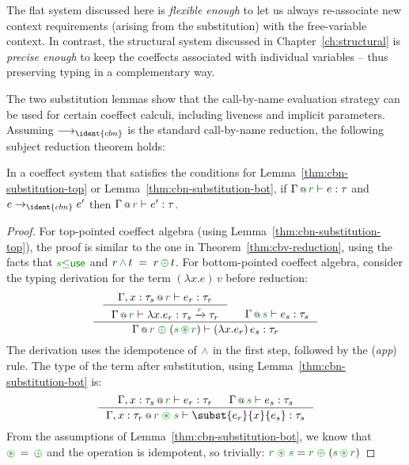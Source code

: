 \noindent
The flat system discussed here is \emph{flexible enough} to let us always re-associate new context 
requirements (arising from the substitution) with the free-variable context. In contrast, the 
structural system discussed in Chapter~\ref{ch:structural} is \emph{precise enough} to keep the 
coeffects associated with individual variables -- thus preserving typing in a complementary way.

The two substitution lemmas show that the call-by-name evaluation strategy can be used for
certain coeffect calculi, including liveness and implicit parameters. Assuming
$\reduce_{\ident{cbn}}$ is the standard call-by-name reduction, the following subject reduction
theorem holds:

\begin{theorem}
In a coeffect system that satisfies the conditions for Lemma~\ref{thm:cbn-substitution-top} or
Lemma~\ref{thm:cbn-substitution-bot}, if $\coctx{\Gamma}{\cclrd{r}} \vdash e : \tau$ 
and $e \rightarrow_{\ident{cbn}} e'$ then $\coctx{\Gamma}{\cclrd{r}} \vdash e' : \tau$.
\end{theorem}
\begin{proof}

For top-pointed coeffect algebra (using Lemma~\ref{thm:cbn-substitution-top}), the proof is similar
to the one in Theorem~\ref{thm:cbv-reduction}, using the facts that $\cclrd{s} \cleq \cunit$
and $r \,\czip\, t \;=\; r \,\cpar\, t$.
For bottom-pointed coeffect algebra, consider the typing derivation for the term
$(\lambda x.e)\,v$ before reduction:
%
\begin{equation*}
\inference
  { \inference
      {\coctx{\Gamma, x:\tau_s}{\cclrd{r}} \vdash e_r : \tau_r}
      {\coctx{\Gamma}{\cclrd{r}} \vdash \lambda x.e_r : \tau_s \xrightarrow{\cclrd{r}} \tau_r } &
   \coctx{\Gamma}{\cclrd{s}} \vdash e_s : \tau_s }
  {\coctx{\Gamma}{\cclrd{r} \;\cpar\; (\cclrd{s} \,\cseq\, \cclrd{r})} \vdash (\lambda x.e_r)\,e_s : \tau_r }
\end{equation*}
%
The derivation uses the idempotence of $\czip$ in the first step, followed by the 
(\emph{app}) rule. The type of the term after substitution, using Lemma~\ref{thm:cbn-substitution-bot} is:
%
\begin{equation*}
\inference
  { \coctx{\Gamma, x:\tau_s}{\cclrd{r}} \vdash e_r : \tau_r & 
    \coctx{\Gamma}{\cclrd{s}} \vdash e_s : \tau_s }
  { \coctx{\Gamma, x:\tau_r}{\cclrd{r}\;\cseq\;\cclrd{s}} \vdash \subst{e_r}{x}{e_s} : \tau_s }
\end{equation*}
%
From the assumptions of Lemma~\ref{thm:cbn-substitution-bot}, we know that $\cseq\,=\,\cpar$
and the operation is idempotent, so trivially:
$\cclrd{r}\;\cseq\;\cclrd{s} = \cclrd{r} \;\cpar\; (\cclrd{s} \,\cseq\, \cclrd{r})$
\end{proof}

